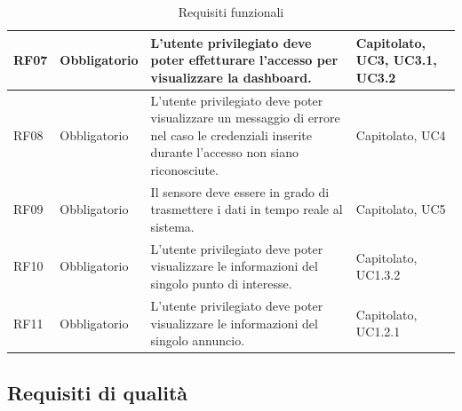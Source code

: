 \documentclass[11pt]{article}
\begin{document}
\begin{justify}
\begin{table}[H]
\begin{tabular}{|>{\centering\arraybackslash}m{2.7cm}|>{\centering\arraybackslash}m{2.7cm}|>{\centering\arraybackslash}m{6cm}|>{\centering\arraybackslash}m{2.1cm}|}
\hline
RF07 & Obbligatorio & L'utente privilegiato deve poter effetturare l'accesso per visualizzare la dashboard. & Capitolato, UC3, UC3.1, UC3.2\\
\hline
RF08 & Obbligatorio & L'utente privilegiato deve poter visualizzare un messaggio di errore nel caso le credenziali inserite durante l'accesso non siano riconosciute. & Capitolato, UC4\\
\hline
RF09 & Obbligatorio & Il sensore deve essere in grado di trasmettere i dati in tempo reale al sistema. & Capitolato, UC5\\
\hline
RF10 & Obbligatorio & L'utente privilegiato deve poter visualizzare le informazioni del singolo punto di interesse. & Capitolato, UC1.3.2\\
\hline
RF11 & Obbligatorio & L'utente privilegiato deve poter visualizzare le informazioni del singolo annuncio. & Capitolato, UC1.2.1\\
\hline
\end{tabular}
\caption{Requisiti funzionali}
\end{table}

\newpage
\subsection{Requisiti di qualità}


\end{justify}
\end{document}
